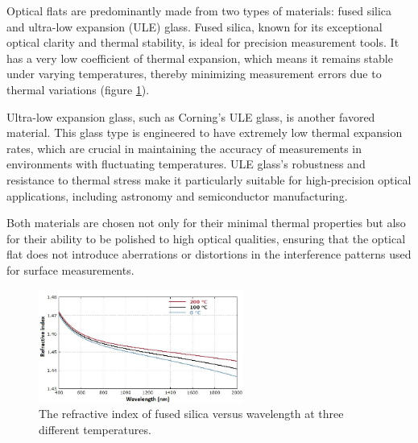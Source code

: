 \documentclass[../main.tex]{subfiles}
\begin{document}
\vspace{-10pt}

Optical flats are predominantly made from two types of materials: fused silica and ultra-low expansion (ULE) glass. Fused silica, known for its exceptional optical clarity and thermal stability, is ideal for precision measurement tools. It has a very low coefficient of thermal expansion, which means it remains stable under varying temperatures, thereby minimizing measurement errors due to thermal variations (figure \ref{fig:refractive_index_silica}).\cite{Paschottafused_silica}

Ultra-low expansion glass, such as Corning's ULE glass, is another favored material. This glass type is engineered to have extremely low thermal expansion rates, which are crucial in maintaining the accuracy of measurements in environments with fluctuating temperatures. ULE glass's robustness and resistance to thermal stress make it particularly suitable for high-precision optical applications, including astronomy and semiconductor manufacturing.\cite{Corning_2022}

Both materials are chosen not only for their minimal thermal properties but also for their ability to be polished to high optical qualities, ensuring that the optical flat does not introduce aberrations or distortions in the interference patterns used for surface measurements.\cite{Corning_2022,Paschottafused_silica,doi:https://doi.org/10.1002/9780470135976.ch1}

\vspace{-12pt}


\begin{figure}[H]
    \centering
    \includegraphics[width=0.6\textwidth]{Images/Introduction/silica_refractive_index2}
    \vspace{-8pt}
    \caption{The refractive index of fused silica versus wavelength at three different temperatures. \cite{Paschottafused_silica}}
    \label{fig:refractive_index_silica}
\end{figure}

\vspace{-25pt}
\end{document}
